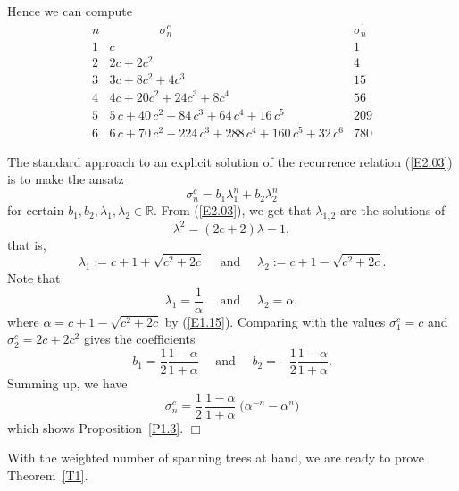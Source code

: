 \documentclass[11pt]{article}
\providecommand{\1}{\mathBB{1}}
\newcommand{\mbu}{\quad\mbox{ and }\quad}
\newcommand{\R}{{\mathbb{R}}}
\newcommand{\equ}[1]{(\ref{#1})}
\providecommand{\eop}{{}\hfill {}\hfill{$\Box
$}\vspace{0.3cm}\pagebreak[2]\par}
\begin{document}
 Hence we can compute
\begin{equation}
\label{E2.05}
\begin{array}{c|l|r}
n&\qquad\qquad\sigma^c_n&\sigma^1_n\\\hline
1&c&1\\
2&2c+2c^2&4\\
3&3c+8c^2+4c^3&15\\
4&4c+20c^2+24c^3+8c^4&56\\
5&5\,c+40\,{c}^{2}+84\,{c}^{3}+64\,{c}^{4}+16\,{c}^{5}&209\\
6&6\,c+70\,{c}^{2}+224\,{c}^{3}+288\,{c}^{4}+160\,{c}^{5}+32\,{c}^{6}&780
\end{array}
\end{equation}

The standard approach to an explicit solution of the recurrence relation \equ{E2.03} is to make the ansatz
$$\sigma^c_n=b_1\lambda_1^n+b_2\lambda_2^n$$
for certain $b_1,b_2,\lambda_1,\lambda_2\in\R$. From \equ{E2.03}, we get that $\lambda_{1,2}$ are the solutions of
$$\lambda^2=(2c+2)\lambda-1,$$
that is,
\begin{equation}
\label{E2.06}
\lambda_1:=c+1+\sqrt{c^2+2c}\mbu \lambda_2:=c+1-\sqrt{c^2+2c}.
\end{equation}
Note that
\begin{equation}
\label{E2.07}
\lambda_1=\frac{1}{\alpha}\mbu \lambda_2=\alpha,
\end{equation}
where $\alpha=c+1-\sqrt{c^2+2c}$ by \equ{E1.15}.
Comparing with the values $\sigma^c_1=c$ and $\sigma^c_2=2c+2c^2$ gives the coefficients
$$b_1=\frac12\frac{1-\alpha}{1+\alpha}\mbu b_2=-\frac12\frac{1-\alpha}{1+\alpha}.$$
Summing up, we have
$$\sigma^c_n=\frac12\,\frac{1-\alpha}{1+\alpha}\;\big(\alpha^{-n}-\alpha^n\big)
$$
which shows Proposition~\ref{P1.3}.
\eop

With the weighted number of spanning trees at hand, we are ready to prove Theorem~\ref{T1}.\medskip
\end{document}
